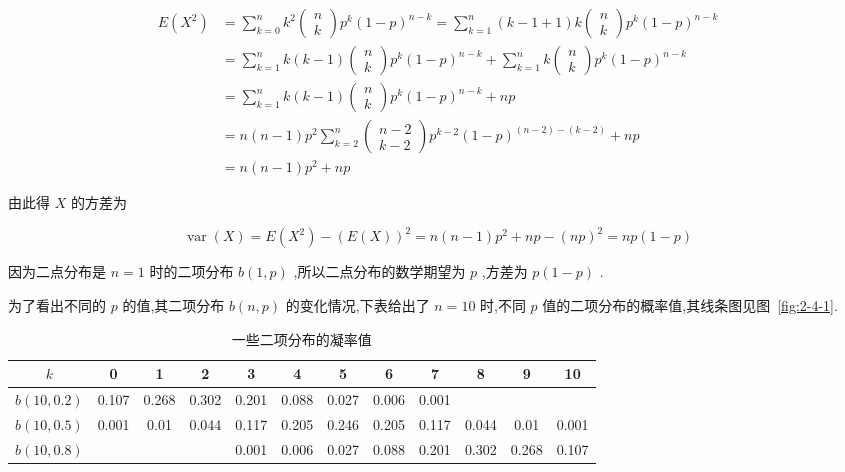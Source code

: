 \[
\begin{array}{ll}
{E\left(X^{2}\right)} & {=\sum_{k=0}^{n} k^{2} \left( 
	\begin{array}{c}
	{n} \\ 
	{k}
	\end{array}
	\right) 
	p^{k}(1-p)^{n-k}=\sum_{k=1}^{n}(k-1+1) k \left( 
	\begin{array}{c}{n} \\ 
	{k}
	\end{array}
	\right) 
	p^{k}(1-p)^{n-k}} \\ 
{}&{=\sum_{k=1}^{n} k(k-1) \left( 
	\begin{array}{c}{n} \\ 
	{k}
	\end{array}
	\right) 
	p^{k}(1-p)^{n-k}+\sum_{k=1}^{n} k \left( 
	\begin{array}{c}{n} \\ 
	{k}
	\end{array}
	\right) 
	p^{k}(1-p)^{n-k}} \\ 
{}&{=\sum_{k=1}^{n} k(k-1) \left( 
	\begin{array}{c}{n} \\ 
	{k}
	\end{array}
	\right) 
	p^{k}(1-p)^{n-k}+n p} \\ 
{}&{=n(n-1) p^{2} \sum_{k=2}^{n} \left( 
	\begin{array}{c}{n-2} \\ 
	{k-2}
	\end{array}
	\right) 
	p^{k-2}(1-p)^{(n-2)-(k-2)}+n p} \\ 
{}&{=n(n-1) p^{2}+n p}
\end{array}
\]

由此得 $ X $ 的方差为

\[
\operatorname{var}(X)=E\left(X^{2}\right)-(E(X))^{2}=n(n-1) p^{2}+n p-(n p)^{2}=n p(1-p)
\]

因为二点分布是 $ n=1 $ 时的二项分布 $ b(1,p) $ ,所以二点分布的数学期望为 $ p $ ,方差为 $ p(1-p) $ .

为了看出不同的 $ p $ 的值,其二项分布 $ b(n,p) $ 的变化情况,下表给出了 $ n=10 $ 时,不同 $ p $ 值的二项分布的概率值,其线条图见图~\ref{fig:2-4-1}.

\begin{table}[htbp]
	\centering
	\caption{一些二项分布的凝率值}
	\begin{tabular}{c|ccccccccccc}
		\toprule
		 $ k $ & 0     & 1     & 2     & 3     & 4     & 5     & 6     & 7     & 8     & 9     & 10 \\\midrule
		 $ b(10,0.2) $ & 0.107 & 0.268 & 0.302 & 0.201 & 0.088 & 0.027 & 0.006 & 0.001 &       &       &  \\
		 $ b(10,0.5) $ & 0.001 & 0.01  & 0.044 & 0.117 & 0.205 & 0.246 & 0.205 & 0.117 & 0.044 & 0.01  & 0.001 \\
		 $ b(10,0.8) $ &       &       &       & 0.001 & 0.006 & 0.027 & 0.088 & 0.201 & 0.302 & 0.268 & 0.107 \\\bottomrule
	\end{tabular}%
	\label{tab:2.4.1}%
\end{table}%

